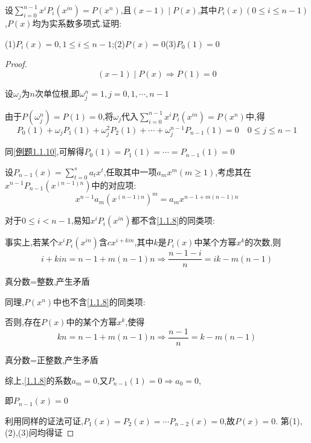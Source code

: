 \begin{example}
    设$\sum\limits_{i=0}^{n-1}x^iP_i(x^{in})=P(x^n)$,且$(x-1)\mid P(x)$,其中$P_i(x)(0\le i\le n-1)$,$P(x)$均为实系数多项式.证明:

    (1)$P_{i}(x)=0,1\le i\le n-1$;\quad(2)$P(x)=0$\quad(3)$P_0(1)=0$
\end{example}

\begin{proof}
    \begin{equation*}
        (x-1)\mid P(x) \Longrightarrow P(1)=0
    \end{equation*}

    设$\omega_j$为$n$次单位根,即$\omega_j^n=1,j=0,1,\cdots,n-1$

    由于$P(\omega_j^n)=P(1)=0$,将$\omega_j$代入$\sum\limits_{i=0}^{n-1}x^iP_i(x^{in})=P(x^n)$中,得
    \begin{equation*}
        P_0(1)+\omega_jP_1(1)+\omega_j^2P_2(1)+\cdots +\omega_j^{n-1}P_{n-1}(1)=0\quad 0\le j\le n-1
    \end{equation*}

    同\cref{例题1.1.10},可解得$P_0(1)=P_1(1)=\cdots=P_{n-1}(1)=0$

    设$P_{n-1}(x)=\sum\limits_{t=0}^s a_tx^t$,任取其中一项$a_m x^m(m\ge 1)$,考虑其在$x^{n-1}P_{n-1}(x^{(n-1)n})$中的对应项:
    \begin{equation}\label{1.1.8}
        x^{n-1}a_m (x^{(n-1)n})^m=a_mx^{n-1+m(n-1)n}
    \end{equation}

    \vspace{4pt}
    对于$0\le i <n-1$,易知$x^i P_i(x^{in})$都不含\cref{1.1.8}的同类项:

    事实上,若某个$x^i P_i(x^{in})$含$cx^{i+kin}$,其中$k$是$P_i(x)$中某个方幂$x^k$的次数,则
    \begin{equation*}
        i+kin=n-1+m(n-1)n\Longrightarrow \frac{n-1-i}{n}=ik-m(n-1)
    \end{equation*}

    真分数=整数,产生矛盾

    \vspace{4pt}
    同理,$P(x^n)$中也不含\cref{1.1.8}的同类项:

    否则,存在$P(x)$中的某个方幂$x^k$,使得
    \begin{equation*}
        kn=n-1+m(n-1)n\Longrightarrow \frac{n-1}{n}=k-m(n-1)
    \end{equation*}

    真分数=正整数,产生矛盾

    综上,\cref{1.1.8}的系数$a_m=0$,又$P_{n-1}(1)=0\Longrightarrow a_0=0$,

    即$P_{n-1}(x)=0$

    利用同样的证法可证,$P_1(x)=P_2(x)=\cdots P_{n-2}(x)=0$,故$P(x)=0$. 第(1),(2),(3)问均得证
\end{proof}

